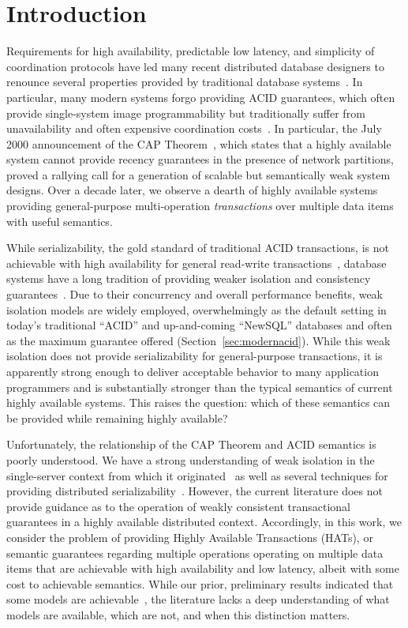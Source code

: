 

\section{Introduction}

Requirements for high availability, predictable low latency, and
simplicity of coordination protocols have led many recent distributed
database designers to renounce several properties provided by
traditional database systems~\cite{bigtable, pnuts, dynamo}. In
particular, many modern systems forgo providing ACID guarantees, which
often provide single-system image programmability but traditionally
suffer from unavailability and often expensive coordination
costs~\cite{davidson-survey}. In particular, the July 2000
announcement of the CAP Theorem~\cite{gilbert-cap}, which states that
a highly available system cannot provide recency guarantees in the
presence of network partitions, proved a rallying call for a
generation of scalable but semantically weak system designs. Over a
decade later, we observe a dearth of highly available systems
providing general-purpose multi-operation \textit{transactions} over
multiple data items with useful semantics.

While serializability, the gold standard of traditional ACID
transactions, is not achievable with high availability for general
read-write transactions~\cite{davidson-survey}, database systems have
a long tradition of providing weaker isolation and consistency
guarantees~\cite{adya, ansicritique, gray-isolation}. Due to their
concurrency and overall performance benefits, weak isolation models
are widely employed, overwhelmingly as the default setting in today's
traditional ``ACID'' and up-and-coming ``NewSQL'' databases and often
as the maximum guarantee offered (Section~\ref{sec:modernacid}). While
this weak isolation does not provide serializability for
general-purpose transactions, it is apparently strong enough to
deliver acceptable behavior to many application programmers and is
substantially stronger than the typical semantics of current highly
available systems. This raises the question: which of these semantics
can be provided while remaining highly available?

Unfortunately, the relationship of the CAP Theorem and ACID semantics
is poorly understood. We have a strong understanding of weak isolation
in the single-server context from which it originated~\cite{adya,
  ansicritique, gray-isolation} as well as several techniques for
providing distributed serializability~\cite{bernstein-concurrency,
  spanner, granola, daudjee-session, calvin}. However, the current
literature does not provide guidance as to the operation of weakly
consistent transactional guarantees in a highly available distributed
context. Accordingly, in this work, we consider the problem of
providing Highly Available Transactions (HATs), or semantic guarantees
regarding multiple operations operating on multiple data items that
are achievable with high availability and low latency, albeit with
some cost to achievable semantics. While our prior, preliminary
results indicated that some models are achievable~\cite{hat-hotos},
the literature lacks a deep understanding of what models are
available, which are not, and when this distinction matters.

